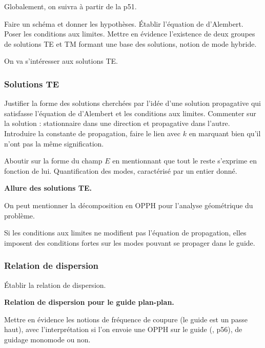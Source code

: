 Globalement, on suivra \cite{Thibierge2014} à partir de la p51.

Faire un schéma et donner les hypothèses.
Établir l'équation de d'Alembert.
Poser les conditions aux limites.
Mettre en évidence l'existence de deux groupes de solutions TE et TM formant une base des solutions, notion de mode hybride.

\begin{transition}
On va s'intéresser aux solutions TE.
\end{transition}

\subsubsection{Solutions TE}

Justifier la forme des solutions cherchées par l'idée d'une solution propagative qui satisfasse l'équation de d'Alembert et les conditions aux limites.
Commenter sur la solution : stationnaire dans une direction et propagative dans l'autre.
Introduire la constante de propagation, faire le lien avec $k$ en marquant bien qu'il n'ont pas la même signification.

Aboutir sur la forme du champ $E$ en mentionnant que tout le reste s'exprime en fonction de lui.
Quantification des modes, caractérisé par un entier donné.

\begin{slide}
\textbf{Allure des solutions TE.}
\end{slide}

On peut mentionner la décomposition en OPPH pour l'analyse géométrique du problème.

\begin{transition}
Si les conditions aux limites ne modifient pas l'équation de propagation, elles imposent des conditions fortes sur les modes pouvant se propager dans le guide.
\end{transition}

\subsubsection{Relation de dispersion}

Établir la relation de dispersion.

\begin{slide}
\textbf{Relation de dispersion pour le guide plan-plan.}
\end{slide}

Mettre en évidence les notions de fréquence de coupure (le guide est un passe haut), avec l'interprétation si l'on envoie une OPPH sur le guide (\cite{Thibierge2014}, p56), de guidage monomode ou non.

